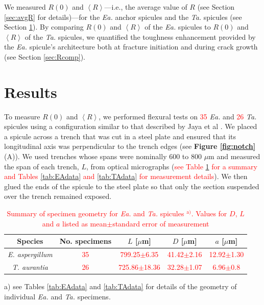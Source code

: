 \documentclass[12pt,onecolumn]{article}
\makeatletter
\newcommand{\TA}{\textit{Ta.\@}\xspace}
\newcommand{\EA}{\textit{Ea.\@}\xspace}
\newcommand{\ra}[1]{\renewcommand{\arraystretch}{#1}}
\makeatother
\begin{document}
\begin{bibunit}
We measured $R(0)$ and $\left< R \right>$---i.e., the average value of $R$ (see Section \ref{sec:avgR} for details)---for the \EA anchor spicules and the \TA spicules (see Section \ref{sec:res}). By comparing $R(0)$ and $\left< R \right>$ of the \EA spicules to $R(0)$ and $\left< R \right>$ of the \TA spicules, we quantified the toughness enhancement provided by the \EA spicule's architecture both at fracture initiation and during crack growth (see Section \ref{sec:Rcomp}).

\section{Results}
\label{sec:res}
To measure $R(0)$ and $\left< R \right>$, we performed flexural tests on \textcolor{red}{35} \EA and \textcolor{red}{26} \TA spicules using a configuration similar to that described  by Jaya et al \cite{jaya2012new,jaya2014crack,jaya2015can}. We placed a spicule across a trench that was cut in a steel plate and ensured that its longitudinal axis was perpendicular to the trench edges (see {\bf Figure \ref{fig:notch}} (A)). We used trenches whose spans were nominally 600 to 800 $\mu$m and measured the span of each trench, $L$, from optical micrographs (\textcolor{red}{see Table \ref{tab:spiculegeom} for a summary and Tables \ref{tab:EAdata} and \ref{tab:TAdata} for measurement details}). We then glued the ends of the spicule to the steel plate so that only the section suspended over the trench remained exposed. 
%
\begin{table}
\centering
\caption{\textcolor{red}{Summary of specimen geometry for \EA and \TA spicules $^\text{a)}$. Values for $D$, $L$ and $a$ listed as mean$\pm$standard error of measurement}}
\label{tab:spiculegeom}
\ra{1.25}
\begin{threeparttable}[t]
\begin{tabular}{ccccc}
\toprule
Species & No. specimens & $L$ [$\mu$m] & $D$ [$\mu$m] & $a$ [$\mu$m]\\
\midrule
\textit{E. aspergillum} & \textcolor{red}{35} & \textcolor{red}{799.25$\pm$6.35} & \textcolor{red}{41.42$\pm$2.16} & \textcolor{red}{12.92$\pm$1.30}\\
\textit{T. aurantia} & \textcolor{red}{26} & \textcolor{red}{725.86$\pm$18.36} & \textcolor{red}{32.28$\pm$1.07} & \textcolor{red}{6.96$\pm$0.8}\\
\bottomrule
\end{tabular}
\begin{tablenotes}
\item[a)] {\footnotesize see Tables \ref{tab:EAdata} and \ref{tab:TAdata} for details of the geometry of individual \EA and \TA specimens.}
\end{tablenotes}
\end{threeparttable}
\end{table}


\end{bibunit}
\end{document}
